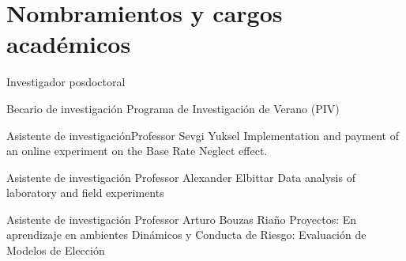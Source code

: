 \section{Nombramientos y cargos académicos}

{Investigador posdoctoral}{}{}{}

{Becario de investigación}
{}{}
{Programa de Investigación de Verano (PIV)}

{Asistente de investigación}{Professor Sevgi Yuksel}
{}
{Implementation and payment of an online experiment on the Base Rate Neglect effect.}

{Asistente de investigación}
{Professor Alexander Elbittar}
{}
{Data analysis of  laboratory and field experiments}

{Asistente de investigación}
{Professor Arturo Bouzas Riaño}
{}
{Proyectos: En aprendizaje en ambientes Dinámicos y Conducta de Riesgo: Evaluación de Modelos de Elección}{}{}{}

%

%
	 
	 